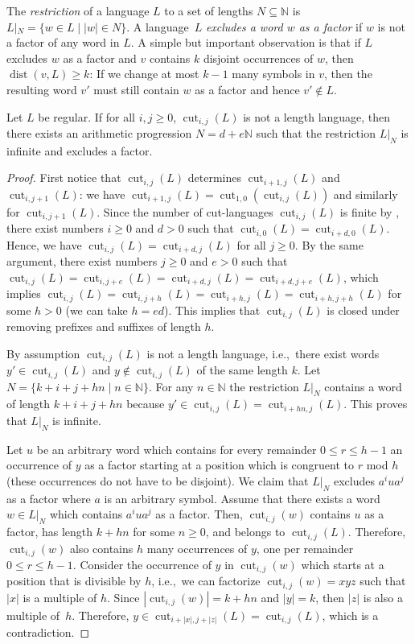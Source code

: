 \documentclass{article}\usepackage[a4paper,margin=20mm]{geometry}
\newcommand{\N}{\mathbb{N}}
\DeclareMathOperator{\dist}{dist}
\DeclareMathOperator{\cut}{cut}
\renewcommand{\geq}{\geqslant}
\renewcommand{\leq}{\leqslant}
\renewcommand{\ge}{\geq}
\renewcommand{\le}{\leq}
\begin{document}
The {\em restriction} of a language $L$ to a set of lengths $N \subseteq \N$
is $L|_N = \{ w \in L \mid |w| \in N \}$.
A language~$L$ {\em excludes a word $w$ as a factor} if $w$ is not a factor of any word in $L$.
A simple but important observation is that if $L$ excludes $w$ as a factor
and $v$ contains $k$ disjoint occurrences of $w$,
then $\dist(v,L) \ge k$: If we change at most $k-1$ many symbols in $v$, then the resulting
word $v'$ must still contain $w$ as a factor and hence $v' \notin L$. 

\begin{lemma}
	\label{prop-nontriv}
	Let $L$ be regular. If for all $i, j \ge 0$, $\cut_{i,j}(L)$ is not a length language,
	then there exists an arithmetic progression  $N = d+e\N$  such that 
	the restriction $L|_N$ is infinite and excludes a factor. 
\end{lemma}

\begin{proof}
	First notice that $\cut_{i,j}(L)$ determines $\cut_{i+1,j}(L)$ and $\cut_{i,j+1}(L)$: we have
	$\cut_{i+1,j}(L) = \cut_{1,0}(\cut_{i,j}(L))$ and similarly for $\cut_{i,j+1}(L)$.
	Since the number of cut-languages $\cut_{i,j}(L)$ is finite by , there exist numbers $i \ge 0$ and $d > 0$ such that
	$\cut_{i,0}(L) = \cut_{i+d,0}(L)$. Hence, we have $\cut_{i,j}(L) = \cut_{i+d,j}(L)$ for all $j \ge 0$. 
	By the same argument, there exist numbers $j \ge 0$ and $e > 0$ such that
	$\cut_{i,j}(L) = \cut_{i,j+e}(L) = \cut_{i+d,j}(L) = \cut_{i+d,j+e}(L)$, which implies
	$\cut_{i,j}(L) = \cut_{i,j+h}(L) = \cut_{i+h,j}(L) = \cut_{i+h,j+h}(L)$ for some $h>0$ (we can take $h = ed$).
	This implies that $\cut_{i,j}(L)$ is closed under removing prefixes and suffixes of length $h$.
	
	By assumption $\cut_{i,j}(L)$ is not a length language,
	i.e.,~there exist words $y' \in \cut_{i,j}(L)$ and $y \notin \cut_{i,j}(L)$
	of the same length $k$.
	Let $N = \{ k + i + j + hn \mid n \in \N \}$.
	For any $n \in \N$ the restriction $L|_N$ contains a word of length $k+i+j+hn$
	because $y' \in \cut_{i,j}(L) = \cut_{i+hn,j}(L)$.
	This proves that $L|_N$ is infinite.
	
	Let $u$ be an arbitrary word which contains for every remainder $0 \le r \le h-1$
	an occurrence of $y$ as a factor starting at a position which is congruent to $r$ mod $h$ (these occurrences do not have to be disjoint).
	We claim that $L|_N$ excludes $a^i u a^j$ as a factor where $a$ is an arbitrary symbol.
	Assume that there exists a word $w \in L|_N$ which contains $a^i u a^j$ as a factor.
	Then, $\cut_{i,j}(w)$ contains $u$ as a factor, has length $k+hn$ for some $n \ge 0$,
	and belongs to $\cut_{i,j}(L)$.
	Therefore, $\cut_{i,j}(w)$ also contains $h$ many occurrences of $y$, one per remainder $0 \le r \le h-1$.
	Consider the occurrence of $y$ in $\cut_{i,j}(w)$ which starts at a position that is divisible by $h$,
	i.e.,~we can factorize $\cut_{i,j}(w) = xyz$ such that $|x|$ is a multiple of $h$.
	Since $|\cut_{i,j}(w)|=k+hn$ and $|y|=k$, then $|z|$ is also a multiple of~$h$.
	Therefore, $y \in \cut_{i+|x|,j+|z|}(L) = \cut_{i,j}(L)$, which is a contradiction.
\end{proof}
\end{document}
